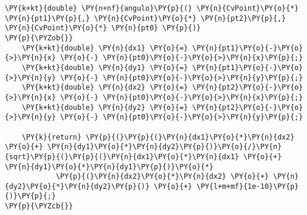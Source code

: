 \begin{Verbatim}[commandchars=\\\{\}]
\PY{k+kt}{double} \PY{n+nf}{angulo}\PY{p}{(} \PY{n}{CvPoint}\PY{o}{*} \PY{n}{pt1}\PY{p}{,} \PY{n}{CvPoint}\PY{o}{*} \PY{n}{pt2}\PY{p}{,} \PY{n}{CvPoint}\PY{o}{*} \PY{n}{pt0} \PY{p}{)}
\PY{p}{\PYZob{}}
    \PY{k+kt}{double} \PY{n}{dx1} \PY{o}{=} \PY{n}{pt1}\PY{o}{-}\PY{o}{>}\PY{n}{x} \PY{o}{-} \PY{n}{pt0}\PY{o}{-}\PY{o}{>}\PY{n}{x}\PY{p}{;}
    \PY{k+kt}{double} \PY{n}{dy1} \PY{o}{=} \PY{n}{pt1}\PY{o}{-}\PY{o}{>}\PY{n}{y} \PY{o}{-} \PY{n}{pt0}\PY{o}{-}\PY{o}{>}\PY{n}{y}\PY{p}{;}
    \PY{k+kt}{double} \PY{n}{dx2} \PY{o}{=} \PY{n}{pt2}\PY{o}{-}\PY{o}{>}\PY{n}{x} \PY{o}{-} \PY{n}{pt0}\PY{o}{-}\PY{o}{>}\PY{n}{x}\PY{p}{;}
    \PY{k+kt}{double} \PY{n}{dy2} \PY{o}{=} \PY{n}{pt2}\PY{o}{-}\PY{o}{>}\PY{n}{y} \PY{o}{-} \PY{n}{pt0}\PY{o}{-}\PY{o}{>}\PY{n}{y}\PY{p}{;}

    \PY{k}{return} \PY{p}{(}\PY{p}{(}\PY{n}{dx1}\PY{o}{*}\PY{n}{dx2} \PY{o}{+} \PY{n}{dy1}\PY{o}{*}\PY{n}{dy2}\PY{p}{)}\PY{o}{/}\PY{n}{sqrt}\PY{p}{(}\PY{p}{(}\PY{n}{dx1}\PY{o}{*}\PY{n}{dx1} \PY{o}{+} \PY{n}{dy1}\PY{o}{*}\PY{n}{dy1}\PY{p}{)}\PY{o}{*}
            \PY{p}{(}\PY{n}{dx2}\PY{o}{*}\PY{n}{dx2} \PY{o}{+} \PY{n}{dy2}\PY{o}{*}\PY{n}{dy2}\PY{p}{)} \PY{o}{+} \PY{l+m+mf}{1e-10}\PY{p}{)}\PY{p}{;}
\PY{p}{\PYZcb{}}
\end{Verbatim}
